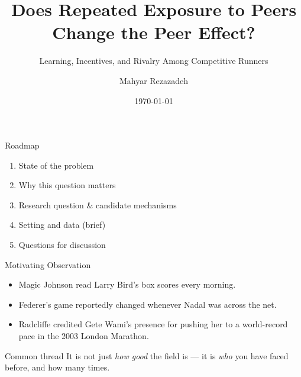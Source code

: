 \documentclass[11pt,aspectratio=169]{beamer}
\title[Familiarity \& Peer Effects]{Does Repeated Exposure to Peers\\Change the Peer Effect?}
\subtitle{Learning, Incentives, and Rivalry Among Competitive Runners}
\author{Mahyar Rezazadeh}
\institute{Meeting with Fernando}
\date{\today}
\begin{document}
\begin{frame}
\titlepage
\end{frame}

\begin{frame}{Roadmap}
\begin{enumerate}
    \item State of the problem
    \item Why this question matters
    \item Research question \& candidate mechanisms
    \item Setting and data (brief)
    \item Questions for discussion
\end{enumerate}
\end{frame}

\begin{frame}{Motivating Observation}
\begin{itemize}
    \item Magic Johnson read Larry Bird's box scores every morning.
    \item Federer's game reportedly changed whenever Nadal was across the net.
    \item Radcliffe credited Gete Wami's presence for pushing her to a
          world-record pace in the 2003 London Marathon.
\end{itemize}
\vspace{0.5em}
\begin{block}{Common thread}
It is not just \emph{how good} the field is --- it is \emph{who} you have
faced before, and how many times.
\end{block}
\end{frame}
\end{document}
